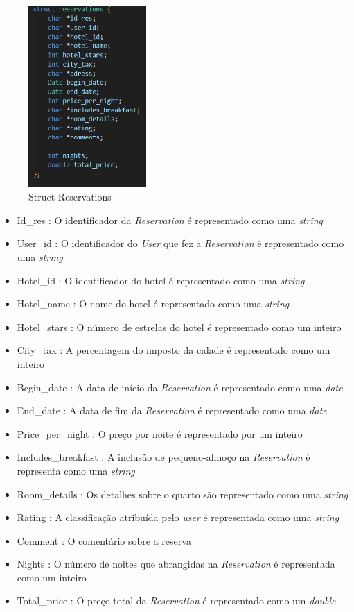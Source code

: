 \documentclass[11pt]{article}
\begin{document}
    \begin{figure}[hbt!]
        \centering
        \includegraphics[width=0.4\textwidth]{reservations.png}
        \caption{Struct Reservations}
        \label{fig:example}
    \end{figure}
    
    \newpage
    
     \begin{itemize}
        \item Id_res : O identificador da \textit{Reservation} é representado como uma \textit{string}
        \item User_id : O identificador do \textit{User} que fez a \textit{Reservation} é representado como uma \textit{string}
        \item Hotel_id : O identificador do hotel é representado como uma \textit{string}
        \item Hotel_name : O nome do hotel é representado como uma \textit{string}
        \item Hotel_stars : O número de estrelas do hotel é representado como um inteiro
        \item City_tax : A percentagem do imposto da cidade é representado como um inteiro
        \item Begin_date : A data de início da \textit{Reservation} é representado como uma \textit{date}
        \item End_date : A data de fim da \textit{Reservation} é representado como uma \textit{date}
        \item Price_per_night : O preço por noite é representado por um inteiro
        \item Includes_breakfast : A inclusão de pequeno-almoço na \textit{Reservation} é representa como uma \textit{string}
        \item Room_details : Os detalhes sobre o quarto são representado como uma \textit{string} 
        \item Rating : A classificação atribuída pelo \textit{user} é representada como uma \textit{string}
        \item Comment : O comentário sobre a reserva 
        \item Nights : O número de noites que abrangidas na \textit{Reservation} é representada como um inteiro
        \item Total_price : O preço total da \textit{Reservation} é representado como um \textit{double}
    \end{itemize}
\newpage
\end{document}
